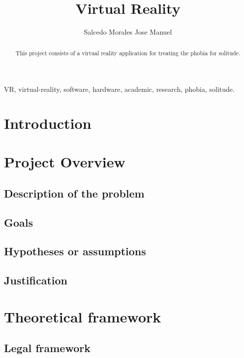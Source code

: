 \documentclass[preprint,12pt]{elsarticle}
\begin{document}
\begin{frontmatter}

\title{Virtual Reality}

\author{Salcedo Morales Jose Manuel}

\address{Mexico, Baja California, Tijuana}

\begin{abstract}
	This project consists of a virtual reality application for treating
	the phobia for solitude.
\end{abstract}

\begin{keyword}
VR, virtual-reality, software, hardware, academic, research, phobia, solitude.
\end{keyword}

\end{frontmatter}

\linenumbers

\newpage
\tableofcontents

\newpage
\section{Introduction}

\newpage
\section{Project Overview}

	\subsection{Description of the problem}
	\subsection{Goals}
	\subsection{Hypotheses or assumptions}
	\subsection{Justification}

\newpage
\section{Theoretical framework}
	\subsection{Legal framework}
\end{document}
